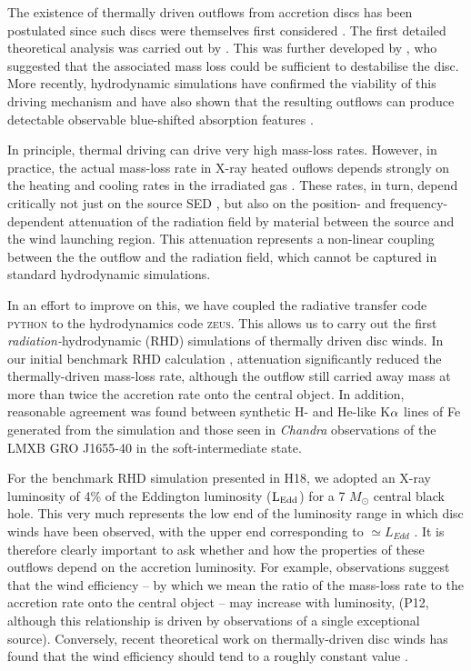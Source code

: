 \documentclass[a4paper,fleqn,usenatbib]{mnras}
\begin{document}
The existence of thermally driven outflows from accretion discs has
been postulated since such discs were themselves 
first considered \citep{1973A&A....24..337S}. The first detailed
theoretical analysis was carried out by
\citet{1983ApJ...271...70B}. This was further developed by
\citet{1986ApJ...306...90S}, who suggested that the associated mass loss
could be sufficient to destabilise the disc. More recently,
hydrodynamic simulations have confirmed the viability of this driving
mechanism and have also shown that the resulting outflows can produce
detectable observable blue-shifted absorption features
\citep{1996ApJ...461..767W,2006ApJ...652L.117N,2010ApJ...719..515L,2015ApJ...807..107H}.  

In principle, thermal driving can drive very high mass-loss
rates. However, in practice, the actual mass-loss rate in X-ray heated
ouflows depends strongly on the heating and cooling rates in the
irradiated gas \citep{2017ApJ...836...42H}. These rates, 
in turn, depend critically not just on the source SED
\citep{2017MNRAS.467.4161D}, but also on the position- and
frequency-dependent attenuation of the
radiation field by material between the source and the wind launching
region. This attenuation represents a non-linear coupling between the
the outflow and the radiation field, which cannot be captured in 
standard hydrodynamic simulations.  

In an effort to improve on this, we have coupled the radiative
transfer code \textsc{python} to the hydrodynamics code
\textsc{zeus}. This allows us to carry out the first {\em
radiation-}hydrodynamic (RHD) simulations of thermally driven disc
winds. In our initial benchmark RHD calculation \citep[hereafter
H18]{2018MNRAS.479.3651H}, attenuation significantly reduced the
thermally-driven mass-loss rate, although the outflow still carried
away mass at more than twice the accretion rate onto the central object.
In addition, reasonable agreement was found between synthetic H- and He-like
 K$\rm{\alpha}$ lines of Fe generated from the simulation and those
seen in \emph{Chandra} observations of the LMXB GRO J1655-40 in the
soft-intermediate state. 
 
For the benchmark RHD simulation presented in H18, we adopted an X-ray
luminosity of 4\% of the Eddington luminosity ($\rm{L_{Edd}}$) for a 7 $M_{\odot}$
central black hole. This very much represents the low end of the
luminosity range in which disc winds have been observed, with the
upper end corresponding to $\simeq L_{Edd}$ \citep[][hereafter
P12]{2012MNRAS.422L..11P}. It is therefore clearly important to ask
whether and how the properties of these outflows depend on the
accretion luminosity. For example, observations suggest that the wind efficiency -- by
which we mean the ratio of the mass-loss rate to the accretion rate
onto the central object -- may increase with luminosity,  
(P12, although this relationship is driven by observations of a single
exceptional source). Conversely, recent theoretical work on
thermally-driven disc winds has found that the wind efficiency should
tend to a roughly constant value \citep[][hereafter D18]{2018MNRAS.473..838D}.
\end{document}
